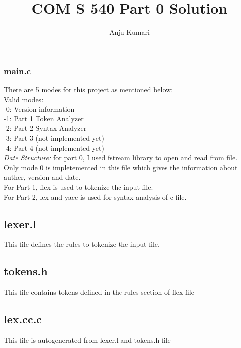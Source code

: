 \documentclass{article}
\title{COM S 540 Part 0 Solution}
\author{Anju Kumari}
\date{}
\begin{document}
   

\maketitle
\section*{}

\subsubsection*{main.c}
There are 5 modes for this project as mentioned below: \\
Valid modes: \\
-0: Version information \\
-1: Part 1 Token Analyzer \\
-2: Part 2 Syntax Analyzer\\
-3: Part 3 (not implemented yet) \\
-4: Part 4 (not implemented yet) \\

{\it Date Structure:} for part 0, I used fstream library to open and read from file. \\
Only mode 0 is impletemented in this file which gives the information about auther, version and date. \\
For Part 1, flex is used to tokenize the input file. \\
For Part 2, lex and yacc is used for syntax analysis of c file. \\

\subsection*{lexer.l}
This file defines the rules to tokenize the input file.

\subsection*{tokens.h}
This file contains tokens defined in the rules section of flex file\\

\subsection*{lex.cc.c}
This file is autogenerated from lexer.l and tokens.h file \\
\end{document}
